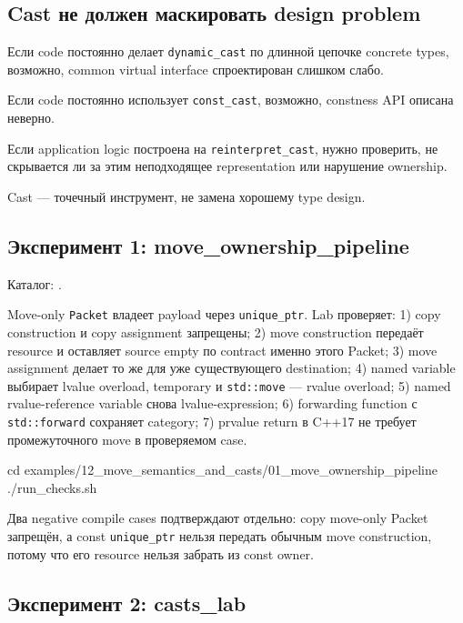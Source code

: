 \subsection{Cast не должен маскировать design problem}

Если code постоянно делает \texttt{dynamic\_cast} по длинной цепочке concrete
types, возможно, common virtual interface спроектирован слишком слабо.

Если code постоянно использует \texttt{const\_cast}, возможно, constness API
описана неверно.

Если application logic построена на \texttt{reinterpret\_cast}, нужно проверить,
не скрывается ли за этим неподходящее representation или нарушение ownership.

Cast --- точечный инструмент, не замена хорошему type design.

\subsection{Эксперимент 1: move\_ownership\_pipeline}

Каталог:
.

Move-only \texttt{Packet} владеет payload через \texttt{unique\_ptr}. Lab
проверяет:
1) copy construction и copy assignment запрещены; 2) move construction передаёт resource и оставляет source empty по contract именно этого Packet; 3) move assignment делает то же для уже существующего destination; 4) named variable выбирает lvalue overload, temporary и \texttt{std::move} --- rvalue overload; 5) named rvalue-reference variable снова lvalue-expression; 6) forwarding function с \texttt{std::forward} сохраняет category; 7) prvalue return в C++17 не требует промежуточного move в проверяемом case.

\begin{shellcode}
cd examples/12_move_semantics_and_casts/01_move_ownership_pipeline
./run_checks.sh
\end{shellcode}

Два negative compile cases подтверждают отдельно:
copy move-only Packet запрещён, а const \texttt{unique\_ptr} нельзя передать
обычным move construction, потому что его resource нельзя забрать из const
owner.

\subsection{Эксперимент 2: casts\_lab}

